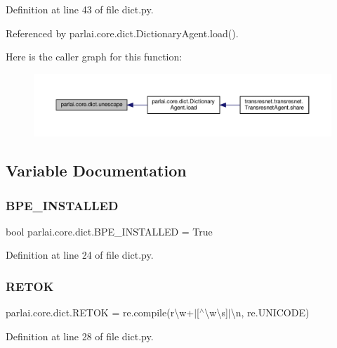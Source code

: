 Definition at line 43 of file dict.\+py.



Referenced by parlai.\+core.\+dict.\+Dictionary\+Agent.\+load().

Here is the caller graph for this function\+:
\nopagebreak
\begin{figure}[H]
\begin{center}
\leavevmode
\includegraphics[width=350pt]{namespaceparlai_1_1core_1_1dict_a4d8952ff127b540967c707a58e8ebb48_icgraph}
\end{center}
\end{figure}


\subsection{Variable Documentation}
\mbox{\label{namespaceparlai_1_1core_1_1dict_a9adf6ecd08289a0b0faa90fd2a507e91}} 
\subsubsection{\texorpdfstring{B\+P\+E\+\_\+\+I\+N\+S\+T\+A\+L\+L\+ED}{BPE\_INSTALLED}}
{\footnotesize\ttfamily bool parlai.\+core.\+dict.\+B\+P\+E\+\_\+\+I\+N\+S\+T\+A\+L\+L\+ED = True}



Definition at line 24 of file dict.\+py.

\mbox{\label{namespaceparlai_1_1core_1_1dict_acc80030514561837c1010293fd1010f4}} 
\subsubsection{\texorpdfstring{R\+E\+T\+OK}{RETOK}}
{\footnotesize\ttfamily parlai.\+core.\+dict.\+R\+E\+T\+OK = re.\+compile(r\textquotesingle{}\textbackslash{}w+$\vert$\mbox{[}$^\wedge$\textbackslash{}w\textbackslash{}s\mbox{]}$\vert$\textbackslash{}n\textquotesingle{}, re.\+U\+N\+I\+C\+O\+DE)}



Definition at line 28 of file dict.\+py.

